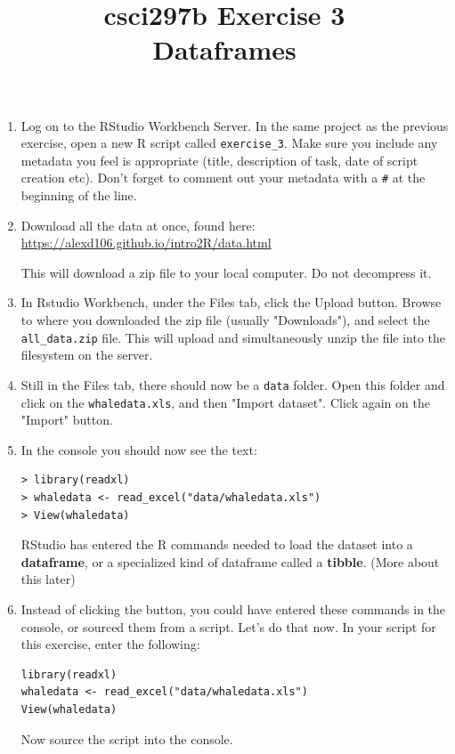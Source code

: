 \documentclass[12pt]{article}
\title{csci297b Exercise 3\\Dataframes }
\date{}
\begin{document}
\maketitle

\begin{enumerate}

\item Log on to the RStudio Workbench Server. 
In the same project as the previous exercise, open a new R script called 
\verb|exercise_3|.
Make sure you include any metadata you feel is appropriate (title, description of task, date of script creation etc). Don’t forget to comment out your metadata with a \lstinline{#} at the beginning of the line.

\item Download all the data at once, found here: \url{https://alexd106.github.io/intro2R/data.html}

This will download a zip file to your local computer.  Do not decompress it.  

\item In Rstudio Workbench, under the Files tab, click the Upload button.  Browse to 
where you downloaded the zip file (usually "Downloads"), and select the 
\verb|all_data.zip| file.  This will upload and simultaneously unzip
the file into the filesystem on the server.

\item Still in the Files tab, there should now be a \verb|data| folder.  Open this folder
and click on the \verb|whaledata.xls|, and then "Import dataset".  Click again
on the "Import" button.

\item In the console you should now see the text:
\begin{lstlisting}
> library(readxl)
> whaledata <- read_excel("data/whaledata.xls")
> View(whaledata)                                                                        
\end{lstlisting}
RStudio has entered the R commands needed to load the dataset into a {\bf dataframe},
or a specialized kind of dataframe called a {\bf tibble}.  (More about this later)

\item
Instead of clicking the button, you could have entered these commands
in the console, or sourced them from a script.  Let's do that now.  In your
script for this exercise, enter the following:
\begin{lstlisting}
library(readxl)
whaledata <- read_excel("data/whaledata.xls")
View(whaledata)                                                                        
\end{lstlisting}
Now source the script into the console.  


\end{enumerate}
\end{document}
